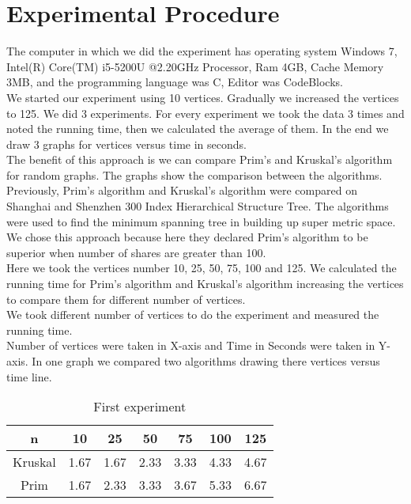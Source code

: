 \documentclass[conference,column]{IEEEtran}
\begin{document}
\section{Experimental Procedure}
The computer in which we did the experiment has operating system Windows 7, Intel(R) Core(TM) i5-5200U @2.20GHz Processor, Ram 4GB, Cache Memory 3MB, and the programming language was C, Editor was CodeBlocks.\\

We started our experiment using 10 vertices. Gradually we increased the vertices to 125. We did 3 experiments. For every experiment we took the data 3 times and noted the running time, then we calculated the average of them. In the end we draw 3 graphs for vertices versus time in seconds.\\The benefit of this approach is we can compare Prim's and Kruskal's algorithm for random graphs. The graphs show the comparison between the algorithms.\\
Previously, Prim’s algorithm and Kruskal's algorithm were compared on Shanghai and Shenzhen 300 Index Hierarchical Structure Tree. The algorithms were used to find the minimum spanning tree in building up super metric space. We chose this approach because here they declared Prim's algorithm to be superior when number of shares are greater than 100.\\
Here we took the vertices number 10, 25, 50, 75, 100 and 125. We calculated the running time for Prim's algorithm and Kruskal's algorithm increasing the vertices to compare them for different number of vertices.\\

We took different number of vertices to do the experiment and measured the running time.\\
Number of vertices were taken in X-axis and Time in Seconds were taken in Y-axis. In one graph we compared two algorithms drawing there vertices versus time line.

\begin{table}[!h]
\renewcommand{\arraystretch}{1.3}
\caption{First experiment}
\label{table1}
\centering
\begin{tabular}{|c|c|c|c|c|c|c|}
  \hline
  n & 10 & 25 & 50 & 75 & 100 & 125 \\
  \hline
  Kruskal & 1.67 & 1.67 & 2.33 & 3.33 & 4.33 & 4.67 \\
  \hline
  Prim & 1.67 & 2.33 & 3.33 & 3.67 & 5.33 & 6.67 \\
  \hline
\end{tabular}
\end{table}
\end{document}

